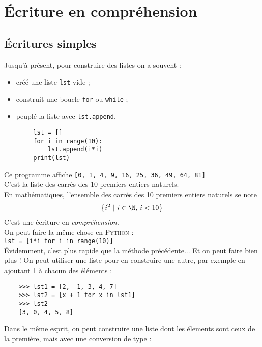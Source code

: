 \chapter{\'Ecriture en compréhension}

\section{\'Ecritures simples}

Jusqu'à présent, pour construire des listes on a souvent :
\begin{itemize}
    \item    créé une liste \texttt{lst} vide ;
    \item    construit une boucle \texttt{for} ou \texttt{while} ;
    \item    peuplé la liste avec \texttt{lst.append}.
\end{itemize}

\begin{exemple}[]
    \begin{verbatim}
        lst = []
        for i in range(10):
            lst.append(i*i)
        print(lst)
    \end{verbatim}
\end{exemple}


Ce programme affiche \texttt{[0, 1, 4, 9, 16, 25, 36, 49, 64, 81]}\\
C'est la liste des carrés des 10 premiers entiers naturels.\\
En mathématiques, l'ensemble des carrés des 10 premiers entiers naturels se note
\[\left\lbrace i^2\ |\ i\in\N,\,i<10\right\rbrace\]
C'est une écriture en \textit{compréhension}.\\
On peut faire la même chose en \textsc{Python} : \\

\texttt{lst = [i*i for i in range(10)]}\\

\'Evidemment, c'est plus rapide que la méthode précédente... Et on peut faire bien plus !
On peut utiliser une liste pour en construire une autre, par exemple en ajoutant 1 à chacun des éléments :
\begin{pyc}
    \begin{verbatim}
    >>> lst1 = [2, -1, 3, 4, 7]
    >>> lst2 = [x + 1 for x in lst1]
    >>> lst2
    [3, 0, 4, 5, 8]
    \end{verbatim}
\end{pyc}
Dans le même esprit, on peut construire une liste dont les élements sont ceux de la première, mais avec une conversion de type :

